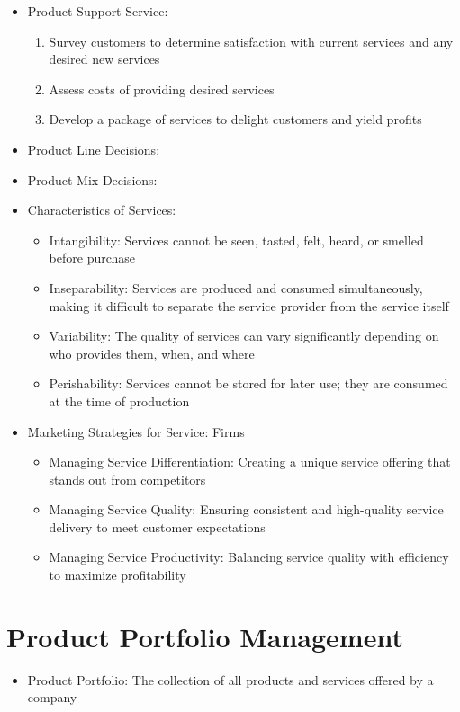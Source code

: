\documentclass[openany,12pt,a4paper]{book}
\begin{document}
\begin{itemize}
    \item Product Support Service:
    \begin{enumerate}
        \item Survey customers to determine satisfaction with current services and any desired new services
        \item Assess costs of providing desired services
        \item Develop a package of services to delight customers and yield profits
    \end{enumerate}
    \item Product Line Decisions: 
    \item Product Mix Decisions:
    \item Characteristics of Services:
    \begin{itemize}
        \item Intangibility: Services cannot be seen, tasted, felt, heard, or smelled before purchase
        \item Inseparability: Services are produced and consumed simultaneously, making it difficult to separate the service provider from the service itself
        \item Variability: The quality of services can vary significantly depending on who provides them, when, and where
        \item Perishability: Services cannot be stored for later use; they are consumed at the time of production
    \end{itemize}
    \item Marketing Strategies for Service: Firms
    \begin{itemize}
        \item Managing Service Differentiation: Creating a unique service offering that stands out from competitors
        \item Managing Service Quality: Ensuring consistent and high-quality service delivery to meet customer expectations
        \item Managing Service Productivity: Balancing service quality with efficiency to maximize profitability
    \end{itemize}
\end{itemize}

\section{Product Portfolio Management}
\begin{itemize}
    \item Product Portfolio: The collection of all products and services offered by a company
\end{itemize}
\end{document}

